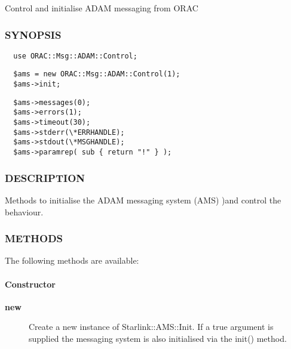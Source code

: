 Control and initialise ADAM messaging from ORAC

\subsubsection*{SYNOPSIS\label{ORAC::Msg::ADAM::Control_SYNOPSIS}}\begin{verbatim}
  use ORAC::Msg::ADAM::Control;
\end{verbatim}
\begin{verbatim}
  $ams = new ORAC::Msg::ADAM::Control(1);
  $ams->init;
\end{verbatim}
\begin{verbatim}
  $ams->messages(0);
  $ams->errors(1);
  $ams->timeout(30);
  $ams->stderr(\*ERRHANDLE);
  $ams->stdout(\*MSGHANDLE);
  $ams->paramrep( sub { return "!" } );
\end{verbatim}
\subsubsection*{DESCRIPTION\label{ORAC::Msg::ADAM::Control_DESCRIPTION}}

Methods to initialise the ADAM messaging system (AMS) )and control the
behaviour.

\subsubsection*{METHODS\label{ORAC::Msg::ADAM::Control_METHODS}}

The following methods are available:

\paragraph*{Constructor\label{ORAC::Msg::ADAM::Control_Constructor}}\begin{description}
\item[\textbf{new}] \mbox{}

Create a new instance of Starlink::AMS::Init.
If a true argument is supplied the messaging system is also
initialised via the init() method.

\end{description}
